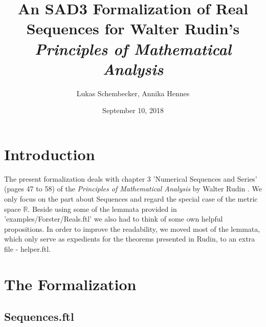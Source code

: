\documentclass{article}
\begin{document}
\title{An SAD3 Formalization of Real Sequences for Walter Rudin's
\it{Principles of Mathematical Analysis}}

\author{Lukas Schembecker, Annika Hennes}

\date{September 10, 2018}

\maketitle


\section{Introduction}
The present formalization deals with chapter 3 'Numerical Sequences and Series' (pages 47 to 58) of the {\it Principles of Mathematical Analysis} by Walter Rudin \cite{Rudin}. We only focus on the part about Sequences and regard the special case of the metric space $\mathbb{R}$. Beside using some of the lemmata provided in 'examples/Forster/Reals.ftl' we also had to think of some own helpful propositions. In order to improve the readability, we moved most of the lemmata, which only serve as expedients for the theorems presented in Rudin, to an extra file - helper.ftl.


\section{The Formalization}
\subsection{Sequences.ftl}
\end{document}
